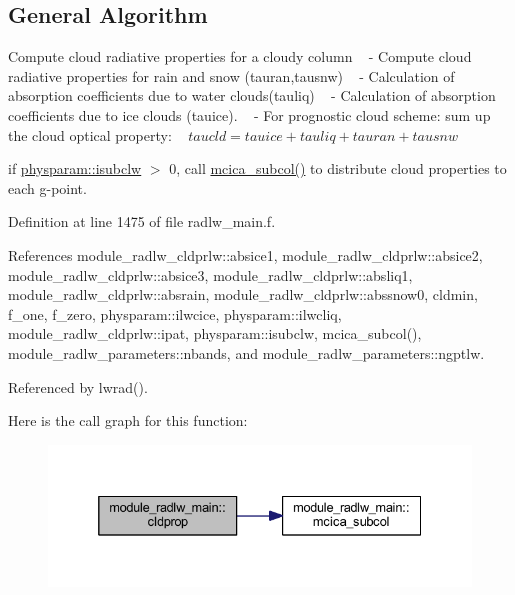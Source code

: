 \hypertarget{namespacemodule__radsw__main_general}{}\subsection{General Algorithm}\label{namespacemodule__radsw__main_general}

\begin{DoxyEnumerate}
\item Compute cloud radiative properties for a cloudy column ~\newline
 -\/ Compute cloud radiative properties for rain and snow (tauran,tausnw) ~\newline
 -\/ Calculation of absorption coefficients due to water clouds(tauliq) ~\newline
 -\/ Calculation of absorption coefficients due to ice clouds (tauice). ~\newline
 -\/ For prognostic cloud scheme\+: sum up the cloud optical property\+: ~\newline
 $ taucld=tauice+tauliq+tauran+tausnw $
\item if \hyperlink{namespacephysparam_a9555bc46102e3c368ca1f15c73b0692e}{physparam\+::isubclw} $>$ 0, call \hyperlink{namespacemodule__radlw__main_a6fd13528cd1e0335fb256c7f199e61bb}{mcica\+\_\+subcol()} to distribute cloud properties to each g-\/point. 
\end{DoxyEnumerate}

Definition at line 1475 of file radlw\+\_\+main.\+f.



References module\+\_\+radlw\+\_\+cldprlw\+::absice1, module\+\_\+radlw\+\_\+cldprlw\+::absice2, module\+\_\+radlw\+\_\+cldprlw\+::absice3, module\+\_\+radlw\+\_\+cldprlw\+::absliq1, module\+\_\+radlw\+\_\+cldprlw\+::absrain, module\+\_\+radlw\+\_\+cldprlw\+::abssnow0, cldmin, f\+\_\+one, f\+\_\+zero, physparam\+::ilwcice, physparam\+::ilwcliq, module\+\_\+radlw\+\_\+cldprlw\+::ipat, physparam\+::isubclw, mcica\+\_\+subcol(), module\+\_\+radlw\+\_\+parameters\+::nbands, and module\+\_\+radlw\+\_\+parameters\+::ngptlw.



Referenced by lwrad().



Here is the call graph for this function\+:\nopagebreak
\begin{figure}[H]
\begin{center}
\leavevmode
\includegraphics[width=332pt]{namespacemodule__radlw__main_a8fb170c933c1644e03d8aaba2451ee0f_cgraph}
\end{center}
\end{figure}




